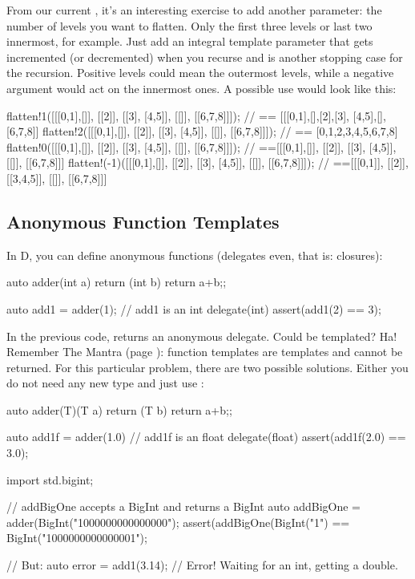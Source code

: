 From our current , it's an interesting exercise to add another parameter: the number of levels you want to flatten. Only the first three levels or last two innermost, for example. Just add an integral template parameter that gets incremented (or decremented) when you recurse and is another stopping case for the recursion. Positive levels could mean the outermost levels, while a negative argument would act on the innermost ones. A possible use would look like this:

\begin{dcode}
flatten!1([[[0,1],[]], [[2]], [[3], [4,5]], [[]], [[6,7,8]]]);
     // == [[[0,1],[],[2],[3], [4,5],[],[6,7,8]]
flatten!2([[[0,1],[]], [[2]], [[3], [4,5]], [[]], [[6,7,8]]]);
     // == [0,1,2,3,4,5,6,7,8]
flatten!0([[[0,1],[]], [[2]], [[3], [4,5]], [[]], [[6,7,8]]]);
     // ==[[[0,1],[]], [[2]], [[3], [4,5]], [[]], [[6,7,8]]]
flatten!(-1)([[[0,1],[]], [[2]], [[3], [4,5]], [[]], [[6,7,8]]]);
     // ==[[[0,1]], [[2]], [[3,4,5]], [[]], [[6,7,8]]]
\end{dcode}

\subsection{Anonymous Function Templates}\label{anonymousfunctions}

In D, you can define anonymous functions (delegates even, that is: closures):

\begin{dcode}
auto adder(int a)
{
    return (int b) { return a+b;};
}

auto add1 = adder(1); // add1 is an int delegate(int)
assert(add1(2) == 3);
\end{dcode}

In the previous code,  returns an anonymous delegate. Could  be templated? Ha! Remember The Mantra (page \pageref{mantra}): function templates are templates and cannot be returned. For this particular problem, there are two possible solutions. Either you do not need any new type and just use :

\begin{dcode}
auto adder(T)(T a)
{
    return (T b) { return a+b;};
}

auto add1f = adder(1.0) // add1f is an float delegate(float)
assert(add1f(2.0) == 3.0);

import std.bigint;

// addBigOne accepts a BigInt and returns a BigInt
auto addBigOne = adder(BigInt("1000000000000000");
assert(addBigOne(BigInt("1") == BigInt("1000000000000001");

// But:
auto error = add1(3.14); // Error! Waiting for an int, getting a double.
\end{dcode}

